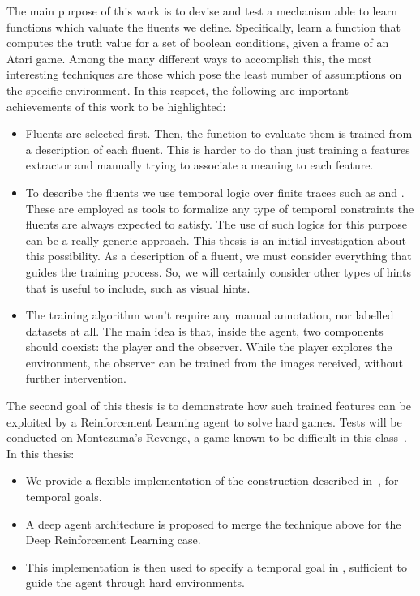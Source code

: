 
The main purpose of this work is to devise and test a mechanism able to learn
functions which valuate the fluents we define.  Specifically, learn a
function that computes the truth value for a set of boolean conditions, given
a frame of an Atari game. Among the many different ways to accomplish this,
the most interesting techniques are those which pose the least number of
assumptions on the specific environment. In this respect, the following are
important achievements of this work to be highlighted:
\begin{itemize}
	\item Fluents are selected first. Then, the function to evaluate them is
		trained from a description of each fluent. This is harder to do than
		just training a features extractor and manually trying to associate a
		meaning to each feature.
	\item To describe the fluents we use temporal logic over finite traces such
		as \ltl{} and \ldl{}. These are employed as tools to formalize any type of
		temporal constraints the fluents are always expected to satisfy. The use
		of such logics for this purpose can be a really generic approach. This
		thesis is an initial investigation about this possibility. As a
		description of a fluent, we must consider everything that guides the
		training process. So, we will certainly consider other types of hints that
		is useful to include, such as visual hints.
	\item The training algorithm won't require any manual annotation, nor
		labelled datasets at all. The main idea is that, inside the agent, two
		components should coexist: the player and the observer. While the player 
		explores the environment, the observer can be trained from the images
		received, without further intervention.
\end{itemize}

The second goal of this thesis is to demonstrate how such trained features can
be exploited by a Reinforcement Learning agent to solve hard games. Tests will
be conducted on Montezuma's Revenge, a game known to be difficult in this
class~\cite{bib:atari-deepq-nature}. In this thesis:
\begin{itemize}
		\item We provide a flexible implementation of the construction described
			in~\cite{bib:degiacomo-logic-nmrdp}\cite{bib:favorito-thesis}, for
			temporal goals.
		\item A deep agent architecture is proposed to merge the technique above
			for the Deep Reinforcement Learning case.
		\item This implementation is then used to specify a temporal goal in
			\ldl{}, sufficient to guide the agent through hard environments.
\end{itemize}


